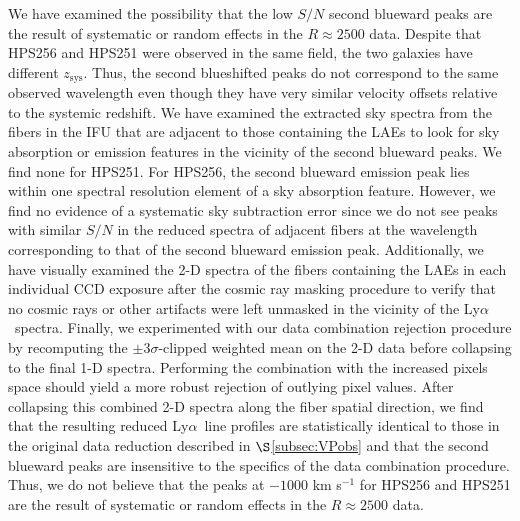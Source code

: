 \documentclass{emulateapj}
\newcommand{\lya}{Ly$\alpha$}
\begin{document}
We have examined the possibility that the low $S/N$ second blueward peaks are the result of systematic or random effects in the $R\approx2500$ data. Despite that HPS256 and HPS251 were observed in the same field, the two galaxies have different $z_{\mathrm{sys}}$. Thus, the second blueshifted peaks do not correspond to the same observed wavelength even though they have very similar velocity offsets relative to the systemic redshift. We have examined the extracted sky spectra from the fibers in the IFU that are adjacent to those containing the LAEs to look for sky absorption or emission features in the vicinity of the second blueward peaks. We find none for HPS251. For HPS256, the second blueward emission peak lies within one spectral resolution element of a sky absorption feature. However, we find no evidence of a systematic sky subtraction error since we do not see peaks with similar $S/N$ in the reduced spectra of adjacent fibers at the wavelength corresponding to that of the second blueward emission peak. Additionally, we have visually examined the 2-D spectra of the fibers containing the LAEs in each individual CCD exposure after the cosmic ray masking procedure to verify that no cosmic rays or other artifacts were left unmasked in the vicinity of the \lya\ spectra. Finally, we experimented with our data combination rejection procedure by recomputing the $\pm$3$\sigma$-clipped weighted mean on the 2-D data before collapsing to the final 1-D spectra. Performing the combination with the increased pixels space should yield a more robust rejection of outlying pixel values. After collapsing this combined 2-D spectra along the fiber spatial direction, we find that the resulting reduced \lya\ line profiles are statistically identical to those in the original data reduction described in $\S$\ref{subsec:VPobs} and that the second blueward peaks are insensitive to the specifics of the data combination procedure. Thus, we do not believe that the peaks at $-1000$ km s$^{-1}$ for HPS256 and HPS251 are the result of systematic or random effects in the $R\approx2500$ data. 
\end{document}
